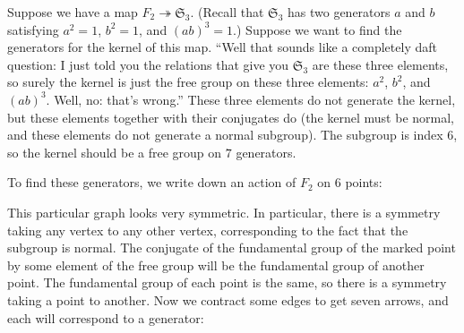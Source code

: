 \documentclass[11pt, twoside]{amsart}
\begin{document}
Suppose we have a map $F_2\twoheadrightarrow \mathfrak{S}_3$. (Recall that $\mathfrak{S}_3$ has two generators $a$ and $b$ satisfying $a^2=1$, $b^2=1$, and $(ab)^3 = 1$.) Suppose we want to find the generators for the kernel of this map. ``Well that sounds like a completely daft question: I just told you the relations that give you $\mathfrak{S}_3$ are these three elements, so surely the kernel is just the free group on these three elements: $a^2$, $b^2$, and $(ab)^3$. Well, no: that's wrong.'' These three elements do not generate the kernel, but these elements together with their conjugates do (the kernel must be normal, and these elements do not generate a normal subgroup). The subgroup is index $6$, so the kernel should be a free group on $7$ generators. 

To find these generators, we write down an action of $F_2$ on $6$ points:
\begin{center}
\end{center}
This particular graph looks very symmetric. In particular, there is a symmetry taking any vertex to any other vertex, corresponding to the fact that the subgroup is normal. The conjugate of the fundamental group of the marked point by some element of the free group will be the fundamental group of another point. The fundamental group of each point is the same, so there is a symmetry taking a point to another.  Now we contract some edges to get seven arrows, and each will correspond to a generator:
\end{document}
